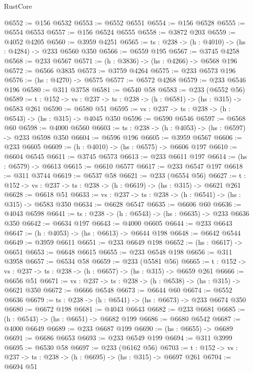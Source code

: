 \begin{lexlean}{RustCore}
\begin{coremodule}
@6552 := @156 @6532
@6553 := @6552 @6551
@6554 := @156 @6528
@6555 := @6554 @6553
@6557 := @156 @6524 @6555
@6558 := @3872 @203
@6559 := @4052 @4205
@6560 := @3959 @4251
@6565 := {ts : @238} -> (h : @4010) -> (hs : @4284) -> @233 @6560 @350
@6566 := @6559 @195
@6567 := @3745 @4258
@6568 := @233 @6567
@6571 := (h : @3836) -> (hs : @4266) -> @6568 @196
@6572 := @6566 @3835
@6573 := @3759 @4264
@6575 := @233 @6573 @196
@6576 := (hs : @4270) -> @6575
@6577 := @6572 @4268
@6579 := @233 @6546 @196
@6580 := @311 @3758
@6581 := @6540 @58
@6583 := @233 (@6552 @56)
@6589 := {t : @152} -> {vs : @237} -> {ts : @238} -> (h : @6581) -> (hs : @315) -> @6583 @261
@6590 := @6580 @51
@6595 := {vs : @237} -> {ts : @238} -> (h : @6543) -> (hs : @315) -> @4045 @350
@6596 := @6590 @6546
@6597 := @6568 @60
@6598 := @4000 @6560
@6603 := {ts : @238} -> (h : @4053) -> (hs : @6597) -> @233 @6598 @350
@6604 := @6596 @196
@6605 := @3959 @6567
@6606 := @233 @6605
@6609 := (h : @4010) -> (hs : @6575) -> @6606 @197
@6610 := @6604 @6545
@6611 := @3745 @6573
@6613 := @233 @6611 @197
@6614 := (hs : @6579) -> @6613
@6615 := @6610 @6577
@6617 := @233 @6547 @197
@6618 := @311 @3744
@6619 := @6537 @58
@6621 := @233 (@6554 @56)
@6627 := {t : @152} -> {vs : @237} -> {ts : @238} -> (h : @6619) -> (hs : @315) -> @6621 @261
@6628 := @6618 @51
@6633 := {vs : @237} -> {ts : @238} -> (h : @6541) -> (hs : @315) -> @6583 @350
@6634 := @6628 @6547
@6635 := @6606 @60
@6636 := @4043 @6598
@6641 := {ts : @238} -> (h : @6543) -> (hs : @6635) -> @233 @6636 @350
@6642 := @6634 @197
@6643 := @4000 @6605
@6644 := @233 @6643
@6647 := (h : @4053) -> (hs : @6613) -> @6644 @198
@6648 := @6642 @6544
@6649 := @3959 @6611
@6651 := @233 @6649 @198
@6652 := (hs : @6617) -> @6651
@6653 := @6648 @6615
@6655 := @233 @6548 @198
@6656 := @311 @3958
@6657 := @6534 @58
@6659 := @233 (@5581 @56)
@6665 := {t : @152} -> {vs : @237} -> {ts : @238} -> (h : @6657) -> (hs : @315) -> @6659 @261
@6666 := @6656 @51
@6671 := {vs : @237} -> {ts : @238} -> (h : @6538) -> (hs : @315) -> @6621 @350
@6672 := @6666 @6548
@6673 := @6644 @60
@6674 := @6552 @6636
@6679 := {ts : @238} -> (h : @6541) -> (hs : @6673) -> @233 @6674 @350
@6680 := @6672 @198
@6681 := @4043 @6643
@6682 := @233 @6681
@6685 := (h : @6543) -> (hs : @6651) -> @6682 @199
@6686 := @6680 @6542
@6687 := @4000 @6649
@6689 := @233 @6687 @199
@6690 := (hs : @6655) -> @6689
@6691 := @6686 @6653
@6693 := @233 @6549 @199
@6694 := @311 @3999
@6695 := @6530 @58
@6697 := @233 (@6162 @56)
@6703 := {t : @152} -> {vs : @237} -> {ts : @238} -> (h : @6695) -> (hs : @315) -> @6697 @261
@6704 := @6694 @51

\end{coremodule}
\end{lexlean}
